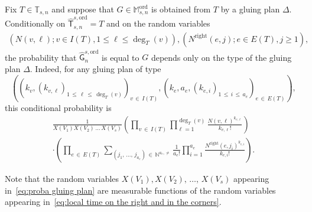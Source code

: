 \documentclass[AHL,Unicode,longabstracts,published]{cedram}
\newcommand{\ord}{\mathrm{ord}}
\newcommand{\Rightll}{\mathrm{right}}
\newcommand{\sG}{\mathsf{G}}
\newcommand{\sT}{\mathsf{T}}
\newcommand{\A}{\mathbb{T}}
\newcommand{\M}{\mathbb{M}}
\newcommand{\N}{\mathbb{N}}
\begin{document}
\begin{prop}\label{prop:proba of a gluing}
Fix $T \in \A_{s,n}$ and suppose that $G \in \M_{s,n}^{\ord}$ is obtained from $T$ by a gluing plan $\Delta$. Conditionally on $\widehat{\sT}_{s,n}^{s,\ord}=T$ and on the random variables
\begin{align}\label{eq:local time on the right and in the corners}
\left(N(v,\ell); v\in I(T), 1\leq \ell \leq \deg_T(v)\right), \left(N^{\Rightll}(e,j); e\in E(T), j\geq 1\right),
\end{align}
the probability that $\widehat{\sG}_{n}^{s,\ord}$ is equal to $G$ depends only on the type of the gluing plan $\Delta$. Indeed, for any gluing plan of type
\[
\left(\left(k_v,\left(k_{v,\ell}\right)_{1\,\leq\,\ell\,\leq\,\deg_T(v)}\right)_{v\,\in\,I(T)}, \left(k_e,a_e,\left(k_{e,i}\right)_{1\,\leq\,i\,\leq\,a_e}\right)_{e\,\in\,E(T)}\right),
\]
this conditional probability is
\begin{multline}\label{eq:proba gluing plan}
\frac{1}{X(V_1)X(V_2)\,\dots\,X(V_s)} \left(\prod_{v\,\in\,I(T)}\prod_{\ell=1}^{\deg_T(v)}\frac{N(v,\ell)^{k_{v,\ell}}}{k_{v,\ell}!}\right)\\
\cdot\left(\prod_{e\,\in\,E(T)}\sum_{(j_1,\,\dots,\,j_{a_e})\,\in\,\N^{a_e,\neq}} \frac{1}{a_e!} \prod_{i=1}^{a_e} \frac{N^{\Rightll}(e,j_{i})^{k_{e,i}}} {k_{e,i}!} \right).
\end{multline}
\end{prop}

Note that the random variables $X(V_1),X(V_2),\,\dots,\,X(V_s)$ appearing in~\eqref{eq:proba gluing plan} are measurable functions of the random variables appearing in~\eqref{eq:local time on the right and in the corners}.
\end{document}
